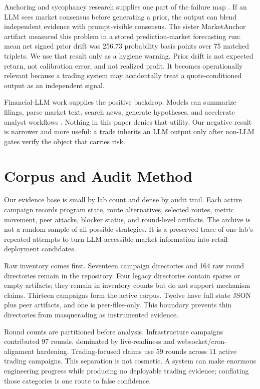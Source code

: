 \documentclass[11pt]{article}
\begin{document}
Anchoring and sycophancy research supplies one part of the failure map \citep{LouSun2024Anchoring}. If an LLM sees market consensus before generating a prior, the output can blend independent evidence with prompt-visible consensus. The sister MarketAnchor artifact measured this problem in a stored prediction-market forecasting run: mean net signed prior drift was 256.73 probability basis points over 75 matched triplets. We use that result only as a hygiene warning. Prior drift is not expected return, not calibration error, and not realized profit. It becomes operationally relevant because a trading system may accidentally treat a quote-conditioned output as an independent signal.

Financial-LLM work supplies the positive backdrop. Models can summarize filings, parse market text, search news, generate hypotheses, and accelerate analyst workflows \citep{Schoenegger2024AIAugmented}. Nothing in this paper denies that utility. Our negative result is narrower and more useful: a trade inherits an LLM output only after non-LLM gates verify the object that carries risk.

\section{Corpus and Audit Method}

Our evidence base is small by lab count and dense by audit trail. Each active campaign records program state, route alternatives, selected routes, metric movement, peer attacks, blocker status, and round-level artifacts. The archive is not a random sample of all possible strategies. It is a preserved trace of one lab's repeated attempts to turn LLM-accessible market information into retail deployment candidates.

Raw inventory comes first. Seventeen campaign directories and 164 raw round directories remain in the repository. Four legacy directories contain sparse or empty artifacts; they remain in inventory counts but do not support mechanism claims. Thirteen campaigns form the active corpus. Twelve have full state JSON plus peer artifacts, and one is peer-files-only. This boundary prevents thin directories from masquerading as instrumented evidence.

Round counts are partitioned before analysis. Infrastructure campaigns contributed 97 rounds, dominated by live-readiness and websocket/cron-alignment hardening. Trading-focused claims use 59 rounds across 11 active trading campaigns. This separation is not cosmetic. A system can make enormous engineering progress while producing no deployable trading evidence; conflating those categories is one route to false confidence.
\end{document}
